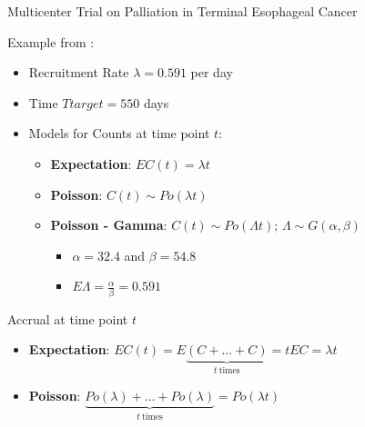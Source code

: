 \documentclass[english]{beamer}\usepackage[]{graphicx}\usepackage[]{xcolor}
\begin{document}
\begin{frame}{Multicenter Trial on Palliation in Terminal Esophageal Cancer}

Example from \cite{carter2004application}:
\begin{itemize}[label = ]
\item Recruitment Rate $\lambda = 0.591$ per day
\item Time $Ttarget = 550$ days
\item Models for Counts at time point $t$:
	\begin{itemize}[label = ]
	\item \textbf{Expectation}: $EC(t) = \lambda t$
	\item \textbf{Poisson}: $C(t) \sim Po(\lambda t)$
	\item \textbf{Poisson - Gamma}: $C(t) \sim Po (\Lambda t)$; $\Lambda \sim G(\alpha,\beta)$
	\begin{itemize}[label = ]
	\item $\alpha = 32.4$ and $\beta = 54.8$
	\item $E\Lambda = \frac{\alpha}{\beta} = 0.591$
	\end{itemize}
	\end{itemize}
\end{itemize}

\end{frame}




\begin{frame}{Accrual at time point $t$}
\begin{itemize}[label = ]
\item \textbf{Expectation}: $EC(t) = E\underbrace{(C +\ldots + C)}_{t \ \text{times}} = t E C = \lambda t$
\item \textbf{Poisson}: $\underbrace{Po (\lambda) +\ldots +Po (\lambda)}_{t \ \text{times}} = Po (\lambda t)$
\end{itemize}
\end{frame}
\end{document}
